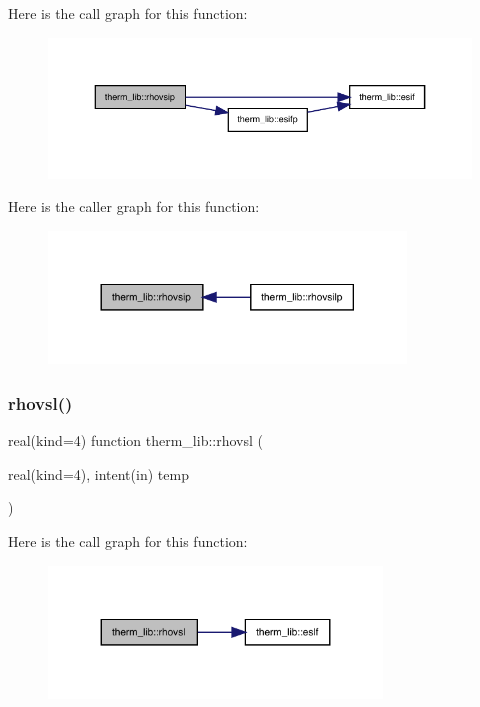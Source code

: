 Here is the call graph for this function\+:
\nopagebreak
\begin{figure}[H]
\begin{center}
\leavevmode
\includegraphics[width=350pt]{namespacetherm__lib_a6bc712cfc32b1dcebed47c8a0942b92f_cgraph}
\end{center}
\end{figure}
Here is the caller graph for this function\+:
\nopagebreak
\begin{figure}[H]
\begin{center}
\leavevmode
\includegraphics[width=269pt]{namespacetherm__lib_a6bc712cfc32b1dcebed47c8a0942b92f_icgraph}
\end{center}
\end{figure}
\mbox{\label{namespacetherm__lib_ade00ab1323488985b9569ba9a5dcde44}} 
\subsubsection{\texorpdfstring{rhovsl()}{rhovsl()}}
{\footnotesize\ttfamily real(kind=4) function therm\+\_\+lib\+::rhovsl (\begin{DoxyParamCaption}\item[{real(kind=4), intent(in)}]{temp }\end{DoxyParamCaption})}

Here is the call graph for this function\+:
\nopagebreak
\begin{figure}[H]
\begin{center}
\leavevmode
\includegraphics[width=251pt]{namespacetherm__lib_ade00ab1323488985b9569ba9a5dcde44_cgraph}
\end{center}
\end{figure}
\mbox{\label{namespacetherm__lib_a47c1103775af2f781f2fabf678217375}} 
